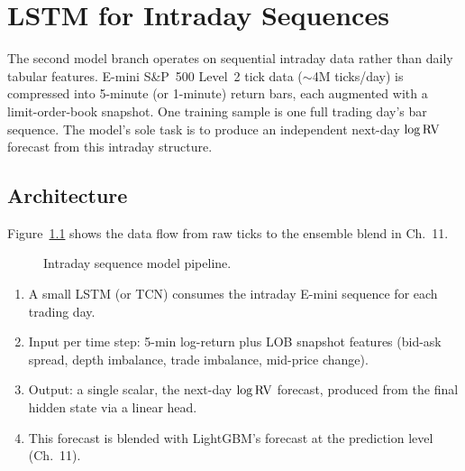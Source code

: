 \chapter{LSTM for Intraday Sequences}
\label{ch:lstm-intraday}

The second model branch operates on sequential intraday data rather than daily tabular features.
E-mini S\&P~500 Level~2 tick data ($\sim$4M ticks/day) is compressed into 5-minute (or 1-minute) return bars, each augmented with a limit-order-book snapshot.
One training sample is one full trading day's bar sequence.
The model's sole task is to produce an independent next-day $\log \operatorname{RV}$ forecast from this intraday structure.

\section{Architecture}

Figure~\ref{fig:lstm-pipeline} shows the data flow from raw ticks to the ensemble blend in Ch.~11.

\begin{figure}[ht]
\centering
{}
\caption{Intraday sequence model pipeline.}
\label{fig:lstm-pipeline}
\end{figure}

\begin{enumerate}[leftmargin=*, itemsep=2pt]
  \item A small LSTM (or TCN) consumes the intraday E-mini sequence for each trading day.
  \item Input per time step: 5-min log-return plus LOB snapshot features (bid-ask spread, depth imbalance, trade imbalance, mid-price change).
  \item Output: a single scalar, the next-day $\log \operatorname{RV}$ forecast, produced from the final hidden state via a linear head.
  \item This forecast is blended with LightGBM's forecast at the prediction level (Ch.~11).
\end{enumerate}

